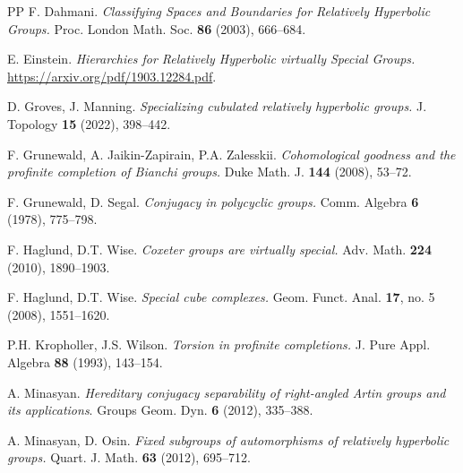 \documentclass[12pt,twoside]{amsart}
\theoremstyle{definition}
\begin{document}
\begin{thebibliography}{PP}
 F. Dahmani. \textsl{Classifying Spaces and Boundaries for Relatively Hyperbolic Groups.} 
Proc. London Math. Soc. {\bf 86} (2003), 666--684.

 E. Einstein. \textsl{Hierarchies  for  Relatively Hyperbolic  virtually Special Groups.} \url{https://arxiv.org/pdf/1903.12284.pdf}. 



 D. Groves, J. Manning. \textsl{Specializing cubulated relatively hyperbolic groups.} J. Topology {\bf 15} (2022), 398--442. 

 F. Grunewald, A. Jaikin-Zapirain, P.A. Zalesskii. \textsl{Cohomological goodness and the profinite completion of Bianchi groups.}  
Duke Math. J. {\bf 144} (2008), 53--72.

 F. Grunewald, D. Segal. \textsl{Conjugacy in polycyclic groups.} Comm. Algebra {\bf 6} (1978), 775--798.


 F. Haglund, D.T. Wise. \textsl{Coxeter groups are virtually special.} Adv. Math. \textbf{224} (2010), 1890--1903.

 F. Haglund, D.T. Wise. \textsl{Special cube complexes.} Geom. Funct. Anal. \textbf{17}, no. 5 (2008), 1551--1620.

P.H. Kropholler, J.S. Wilson. \textsl{Torsion in profinite completions.} J. Pure Appl. Algebra {\bf 88} (1993), 143--154.


A. Minasyan. \textsl{Hereditary conjugacy separability of right-angled Artin groups and its applications}.
Groups Geom. Dyn. {\bf 6} (2012), 335--388.

  A. Minasyan, D. Osin. \textsl{Fixed subgroups of automorphisms of relatively hyperbolic groups.} 
Quart. J. Math. {\bf 63} (2012), 695--712.


\end{thebibliography}
\end{document}
